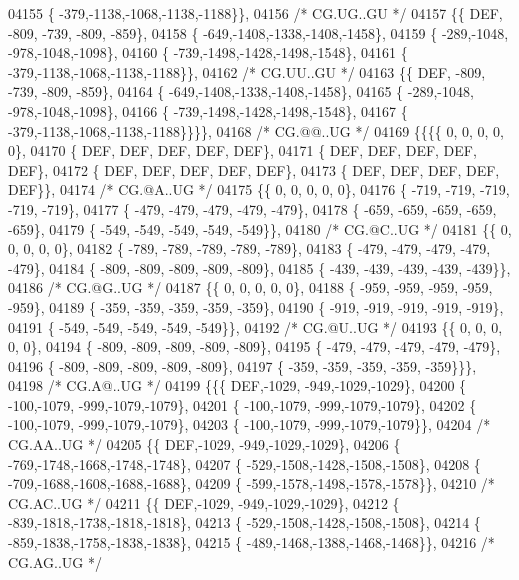 \begin{DoxyCode}
04155 \{ -379,-1138,-1068,-1138,-1188\}\},
04156 \textcolor{comment}{/* CG.UG..GU */}
04157 \{\{  DEF, -809, -739, -809, -859\},
04158 \{ -649,-1408,-1338,-1408,-1458\},
04159 \{ -289,-1048, -978,-1048,-1098\},
04160 \{ -739,-1498,-1428,-1498,-1548\},
04161 \{ -379,-1138,-1068,-1138,-1188\}\},
04162 \textcolor{comment}{/* CG.UU..GU */}
04163 \{\{  DEF, -809, -739, -809, -859\},
04164 \{ -649,-1408,-1338,-1408,-1458\},
04165 \{ -289,-1048, -978,-1048,-1098\},
04166 \{ -739,-1498,-1428,-1498,-1548\},
04167 \{ -379,-1138,-1068,-1138,-1188\}\}\}\},
04168 \textcolor{comment}{/* CG.@@..UG */}
04169 \{\{\{\{    0,    0,    0,    0,    0\},
04170 \{  DEF,  DEF,  DEF,  DEF,  DEF\},
04171 \{  DEF,  DEF,  DEF,  DEF,  DEF\},
04172 \{  DEF,  DEF,  DEF,  DEF,  DEF\},
04173 \{  DEF,  DEF,  DEF,  DEF,  DEF\}\},
04174 \textcolor{comment}{/* CG.@A..UG */}
04175 \{\{    0,    0,    0,    0,    0\},
04176 \{ -719, -719, -719, -719, -719\},
04177 \{ -479, -479, -479, -479, -479\},
04178 \{ -659, -659, -659, -659, -659\},
04179 \{ -549, -549, -549, -549, -549\}\},
04180 \textcolor{comment}{/* CG.@C..UG */}
04181 \{\{    0,    0,    0,    0,    0\},
04182 \{ -789, -789, -789, -789, -789\},
04183 \{ -479, -479, -479, -479, -479\},
04184 \{ -809, -809, -809, -809, -809\},
04185 \{ -439, -439, -439, -439, -439\}\},
04186 \textcolor{comment}{/* CG.@G..UG */}
04187 \{\{    0,    0,    0,    0,    0\},
04188 \{ -959, -959, -959, -959, -959\},
04189 \{ -359, -359, -359, -359, -359\},
04190 \{ -919, -919, -919, -919, -919\},
04191 \{ -549, -549, -549, -549, -549\}\},
04192 \textcolor{comment}{/* CG.@U..UG */}
04193 \{\{    0,    0,    0,    0,    0\},
04194 \{ -809, -809, -809, -809, -809\},
04195 \{ -479, -479, -479, -479, -479\},
04196 \{ -809, -809, -809, -809, -809\},
04197 \{ -359, -359, -359, -359, -359\}\}\},
04198 \textcolor{comment}{/* CG.A@..UG */}
04199 \{\{\{  DEF,-1029, -949,-1029,-1029\},
04200 \{ -100,-1079, -999,-1079,-1079\},
04201 \{ -100,-1079, -999,-1079,-1079\},
04202 \{ -100,-1079, -999,-1079,-1079\},
04203 \{ -100,-1079, -999,-1079,-1079\}\},
04204 \textcolor{comment}{/* CG.AA..UG */}
04205 \{\{  DEF,-1029, -949,-1029,-1029\},
04206 \{ -769,-1748,-1668,-1748,-1748\},
04207 \{ -529,-1508,-1428,-1508,-1508\},
04208 \{ -709,-1688,-1608,-1688,-1688\},
04209 \{ -599,-1578,-1498,-1578,-1578\}\},
04210 \textcolor{comment}{/* CG.AC..UG */}
04211 \{\{  DEF,-1029, -949,-1029,-1029\},
04212 \{ -839,-1818,-1738,-1818,-1818\},
04213 \{ -529,-1508,-1428,-1508,-1508\},
04214 \{ -859,-1838,-1758,-1838,-1838\},
04215 \{ -489,-1468,-1388,-1468,-1468\}\},
04216 \textcolor{comment}{/* CG.AG..UG */}

\end{DoxyCode}
